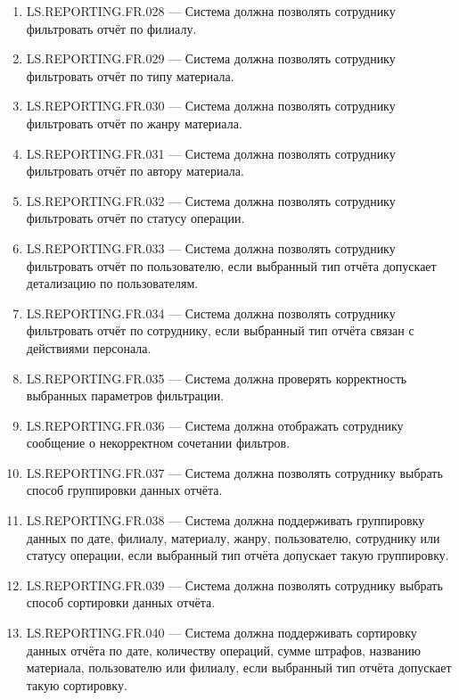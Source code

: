 \documentclass[12pt,a4paper]{article}
\begin{document}
\begin{enumerate}
		\item LS.REPORTING.FR.028 --- Система должна позволять сотруднику фильтровать
		отчёт по филиалу.
		
		\item LS.REPORTING.FR.029 --- Система должна позволять сотруднику фильтровать
		отчёт по типу материала.
		
		\item LS.REPORTING.FR.030 --- Система должна позволять сотруднику фильтровать
		отчёт по жанру материала.
		
		\item LS.REPORTING.FR.031 --- Система должна позволять сотруднику фильтровать
		отчёт по автору материала.
		
		\item LS.REPORTING.FR.032 --- Система должна позволять сотруднику фильтровать
		отчёт по статусу операции.
		
		\item LS.REPORTING.FR.033 --- Система должна позволять сотруднику фильтровать
		отчёт по пользователю, если выбранный тип отчёта допускает детализацию по
		пользователям.
		
		\item LS.REPORTING.FR.034 --- Система должна позволять сотруднику фильтровать
		отчёт по сотруднику, если выбранный тип отчёта связан с действиями персонала.
		
		\item LS.REPORTING.FR.035 --- Система должна проверять корректность выбранных
		параметров фильтрации.
		
		\item LS.REPORTING.FR.036 --- Система должна отображать сотруднику сообщение
		о некорректном сочетании фильтров.
		
		\item LS.REPORTING.FR.037 --- Система должна позволять сотруднику выбрать способ
		группировки данных отчёта.
		
		\item LS.REPORTING.FR.038 --- Система должна поддерживать группировку данных
		по дате, филиалу, материалу, жанру, пользователю, сотруднику или статусу операции,
		если выбранный тип отчёта допускает такую группировку.
		
		\item LS.REPORTING.FR.039 --- Система должна позволять сотруднику выбрать способ
		сортировки данных отчёта.
		
		\item LS.REPORTING.FR.040 --- Система должна поддерживать сортировку данных
		отчёта по дате, количеству операций, сумме штрафов, названию материала,
		пользователю или филиалу, если выбранный тип отчёта допускает такую сортировку.
		

\end{enumerate}
\end{document}
